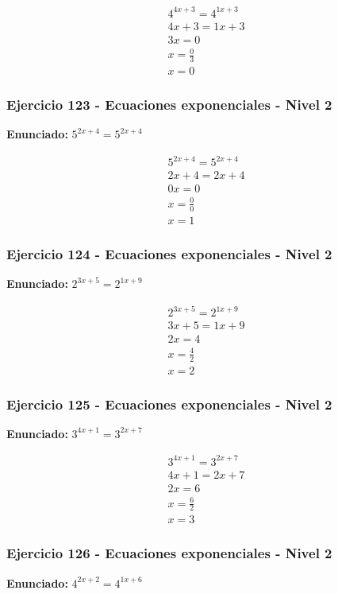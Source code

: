 \documentclass[12pt,a4paper]{article}
\begin{document}
\[
\begin{aligned}
4^{4x+3}=4^{1x+3}\\
4x+3=1x+3\\
3x=0\\
x=\frac{0}{3}\\
\boxed{x=0}
\end{aligned}
\]


\subsubsection*{Ejercicio 123 - Ecuaciones exponenciales - Nivel 2}
\textbf{Enunciado:} \(5^{2x+4}=5^{2x+4}\)

\[
\begin{aligned}
5^{2x+4}=5^{2x+4}\\
2x+4=2x+4\\
0x=0\\
x=\frac{0}{0}\\
\boxed{x=1}
\end{aligned}
\]


\subsubsection*{Ejercicio 124 - Ecuaciones exponenciales - Nivel 2}
\textbf{Enunciado:} \(2^{3x+5}=2^{1x+9}\)

\[
\begin{aligned}
2^{3x+5}=2^{1x+9}\\
3x+5=1x+9\\
2x=4\\
x=\frac{4}{2}\\
\boxed{x=2}
\end{aligned}
\]


\subsubsection*{Ejercicio 125 - Ecuaciones exponenciales - Nivel 2}
\textbf{Enunciado:} \(3^{4x+1}=3^{2x+7}\)

\[
\begin{aligned}
3^{4x+1}=3^{2x+7}\\
4x+1=2x+7\\
2x=6\\
x=\frac{6}{2}\\
\boxed{x=3}
\end{aligned}
\]


\subsubsection*{Ejercicio 126 - Ecuaciones exponenciales - Nivel 2}
\textbf{Enunciado:} \(4^{2x+2}=4^{1x+6}\)
\end{document}
